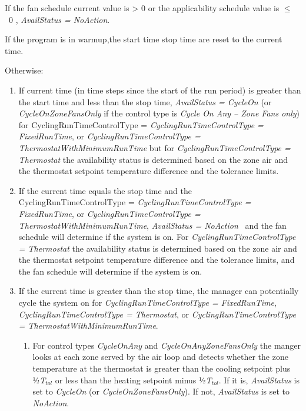 If the fan schedule current value is \textgreater{} 0 or the applicability schedule value is \(\le\) ~0 , \emph{AvailStatus = NoAction}.

If the program is in warmup,the start time stop time are reset to the current time.

Otherwise:

\begin{enumerate}
\item  If current time (in time steps since the start of the run period) is greater than the start time and less than the stop time, \emph{AvailStatus = CycleOn} (or \emph{CycleOnZoneFansOnly} if the control type is \emph{Cycle On Any -- Zone Fans only}) for CyclingRunTimeControlType = \emph{CyclingRunTimeControlType = FixedRunTime}, or \emph{CyclingRunTimeControlType = ThermostatWithMinimumRunTime} but for \emph{CyclingRunTimeControlType = Thermostat} the availability status is determined based on the zone air and the thermostat setpoint temperature difference and the tolerance limits.  

\item  If the current time equals the stop time and the CyclingRunTimeControlType = \emph{CyclingRunTimeControlType = FixedRunTime}, or \emph{CyclingRunTimeControlType = ThermostatWithMinimumRunTime}, \emph{AvailStatus = NoAction} ~and the fan schedule will determine if the system is on. For \emph{CyclingRunTimeControlType = Thermostat} the availability status is determined based on the zone air and the thermostat setpoint temperature difference and the tolerance limits, and the fan schedule will determine if the system is on.

\item  If the current time is greater than the stop time, the manager can potentially cycle the system on for \emph{CyclingRunTimeControlType = FixedRunTime}, \emph{CyclingRunTimeControlType = Thermostat}, or \emph{CyclingRunTimeControlType = ThermostatWithMinimumRunTime}.

  \begin{enumerate}
  \item  For control types \emph{CycleOnAny} and \emph{CycleOnAnyZoneFansOnly} the manger looks at each zone served by the air loop and detects whether the zone temperature at the thermostat is greater than the cooling setpoint plus ½\emph{T\(_{tol}\)} or less than the heating setpoint minus ½\emph{T\(_{tol}\)}. If it is, \emph{AvailStatus} is set to \emph{CycleOn} (or \emph{CycleOnZoneFansOnly}). If not, \emph{AvailStatus} is set to \emph{NoAction}.


\end{enumerate}
\end{enumerate}
